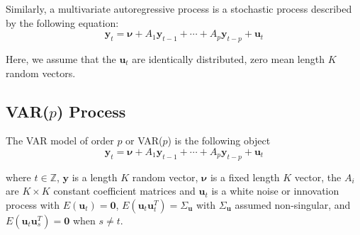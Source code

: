\documentclass{article}
\begin{document}
            Similarly, a multivariate autoregressive process is a stochastic process
            described by the following equation:
            \[
                \mathbf{y}_t = \mathbf{\nu} + A_1 \mathbf{y}_{t-1} + \cdots + A_p \mathbf{y}_{t-p} + \mathbf{u}_t
            \]

            Here, we assume that the $\mathbf{u}_t$ are identically distributed, zero mean
            length $K$ random vectors.

        \subsection{VAR($p$) Process}

            The VAR model of order $p$ or VAR($p$) is the following object
            \[
                \mathbf{y}_t = \mathbf{\nu} + A_1 \mathbf{y}_{t-1} + \cdots + A_p \mathbf{y}_{t-p} + \mathbf{u}_t
            \]

            where $t \in \mathbb{Z}$, $\mathbf{y}$ is a length $K$ random vector,
            $\mathbf{\nu}$ is a fixed length $K$ vector, the $A_i$ are $K \times K$
            constant coefficient matrices and $\mathbf{u}_t$ is a white noise
            or innovation process with $E(\mathbf{u}_t) = \mathbf{0}$, 
            $E(\mathbf{u}_t \mathbf{u}_t^T) = \Sigma_\mathbf{u}$ with 
            $\Sigma_\mathbf{u}$ assumed non-singular, and 
            $E(\mathbf{u}_t \mathbf{u}_s^T) = \mathbf{0}$ when $s \neq t$.
            
\end{document}
